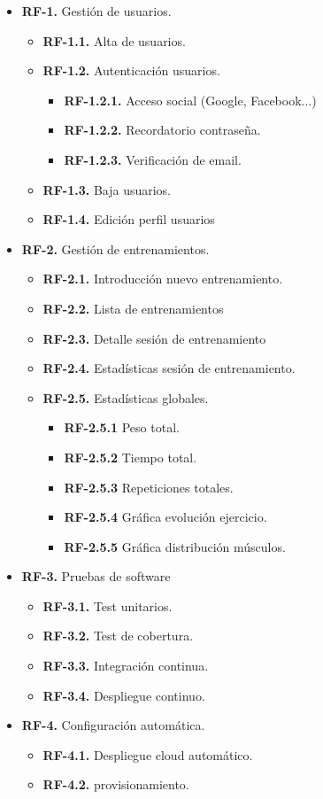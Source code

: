 \begin{itemize}
  \item \textbf{RF-1.} Gestión de usuarios.
  \begin{itemize}
    \item \textbf{RF-1.1.} Alta de usuarios.
    \item \textbf{RF-1.2.} Autenticación usuarios.
    \begin{itemize}
      \item \textbf{RF-1.2.1.} Acceso social (Google, Facebook...)
      \item \textbf{RF-1.2.2.} Recordatorio contraseña.
      \item \textbf{RF-1.2.3.} Verificación de email.
    \end{itemize}
    \item \textbf{RF-1.3.} Baja usuarios.
    \item \textbf{RF-1.4.} Edición perfil usuarios
  \end{itemize}
  \item \textbf{RF-2.} Gestión de entrenamientos.
  \begin{itemize}
    \item \textbf{RF-2.1.} Introducción nuevo entrenamiento.
    \item \textbf{RF-2.2.} Lista de entrenamientos
    \item \textbf{RF-2.3.} Detalle sesión de entrenamiento
    \item \textbf{RF-2.4.} Estadísticas sesión de entrenamiento.
    \item \textbf{RF-2.5.} Estadísticas globales.
    \begin{itemize}
      \item \textbf{RF-2.5.1} Peso total.
      \item \textbf{RF-2.5.2} Tiempo total.
      \item \textbf{RF-2.5.3} Repeticiones totales.
      \item \textbf{RF-2.5.4} Gráfica evolución ejercicio.
      \item \textbf{RF-2.5.5} Gráfica distribución músculos.
    \end{itemize}
  \end{itemize}
  \item \textbf{RF-3.} Pruebas de software
  \begin{itemize}
    \item \textbf{RF-3.1.} Test unitarios.
    \item \textbf{RF-3.2.} Test de cobertura.
    \item \textbf{RF-3.3.} Integración continua.
    \item \textbf{RF-3.4.} Despliegue continuo.
  \end{itemize}
  \item \textbf{RF-4.} Configuración automática.
  \begin{itemize}
    \item \textbf{RF-4.1.} Despliegue cloud automático.
    \item \textbf{RF-4.2.} \Gls{provisionamiento}.
  \end{itemize}
\end{itemize}

